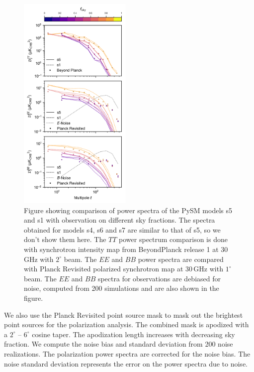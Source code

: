 \documentclass[twocolumn]{aastex631}
\begin{document}
\begin{figure}
   \centering
   \includegraphics[width=0.48\textwidth]{figures/Dlcomp_PySM3-4_s5_vs_BPPR_SYNC.png}
    \caption{Figure showing comparison of power spectra of the PySM models s5 and s1 with observation on different sky fractions. The spectra obtained for models s4, s6 and s7 are similar to that of s5, so we don't show them here. The $TT$ power spectrum comparison is done with synchrotron intensity map from BeyondPlanck release 1 \citep{Andersen:2023} at 30 GHz with $2^\circ$ beam. The $EE$ and $BB$ power spectra are compared with Planck Revisited \citep{Delabrouille:2024} polarized synchrotron map at 30\,GHz with $1^\circ$ beam. The $EE$ and $BB$ spectra for observations are debiased for noise, computed from 200 simulations and are also shown in the figure. }
   \label{fig:Dl_sync_galmask}
\end{figure}

We also use the Planck Revisited point source mask to mask out the brightest point sources for the polarization analysis. The combined mask is apodized with a $2^\circ$ -- $6^\circ$ cosine taper. The apodization length increases with decreasing sky fraction. We compute the noise bias and standard deviation from 200 noise realizations. The polarization power spectra are corrected for the noise bias. The noise standard deviation represents the error on the power spectra due to noise.
\end{document}
